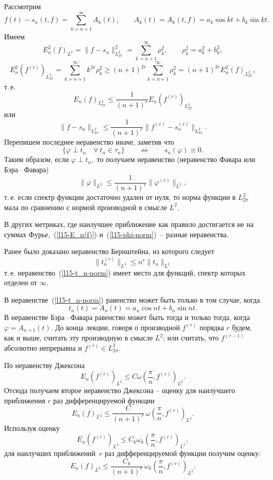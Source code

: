 Рассмотрим
 $$
 f(t)-s_n(t,f)=\sum\limits_{k=n+1}^{\infty} A_k(t),\qquad {A_k(t)=A_k(t,f)=a_k\cos kt+b_k\sin kt}.
 $$
 Имеем
$$
E_n^2(f)_{{L^2}}=\|f-s_n\|_{{L_{2\pi}^2}}^2=\sum\limits_{k=n+1}^{\infty}\rho_k^2,\qquad {\rho_k^2=a_k^2+b_k^2,}
$$
$$
E_n^2(f^{(r)})_{{L_{2\pi}^2}}=\sum\limits_{k=n+1}^{\infty} k^{2r}\rho_k^2 \ge
(n+1)^{2r} \sum\limits_{k=n+1}^{\infty} \rho_k^2=(n+1)^{2r} E_n^2(f)_{{L_{2\pi}^2}},
$$
т.\,е.
\begin{equation}\label{l15-E_n(f)}
E_n(f)_{{L_{2\pi}^2}}\le \frac{1}{(n+1)^{{r}}} E_n (f^{(r)})_{{L_{2\pi}^2}}
\end{equation}
или
$$
\|f-s_n\|_{{L_{2\pi}^2}}\le \frac{1}{(n+1)^r}\|f^{(r)}-s_n^{(r)}\|_{{L_{2\pi}^2}}.
$$
Перепишем последнее неравенство иначе, заметив что
$$
{\{\varphi \perp t_n\quad \forall\ t_n\in \tau_n\}\qquad\Longleftrightarrow\qquad s_n(\varphi)\equiv 0.}
$$
Таким образом, если $\varphi\perp t_n,$ то получаем неравенство (неравенство Фавара или Бэра\,--\,Фавара)
\begin{equation}\label{l15-phi-norm}
\|\varphi\|_{{L^2}}\le\frac{1}{(n+1)^r} \|\varphi^{(r)}\|_{{L^2}},
\end{equation}
т.\,е. если спектр функции достаточно удален от нуля, то норма функции {в $L_{2\pi}^2$} {мала по сравнению с нормой производной в смысле
$L^2$.}

\begin{Remark}
В других метриках, где наилучшее приближение {как правило} достигается {не на} суммах
Фурье,~(\ref{l15-E_n(f)}) и~(\ref{l15-phi-norm})~-- разные неравенства.
\end{Remark}

Ранее было доказано неравенство Бернштейна, из которого следует
\begin{equation}\label{l15-t_n-norm}
\|t_n^{(r)}\|_{{L^2}}\le n^r \|t_n\|_{{L^2}}
\end{equation}
т.\,е. неравенство~(\ref{l15-t_n-norm}) имеет место для функций, спектр
которых отделен от $\infty.$

В неравенстве~(\ref{l15-t_n-norm}) равенство может быть только в том
случае, когда
$$ t_n(t)=A_n(t)=a_n\cos nt+b_n\sin nt.$$
В неравенстве Бэра\,--\,Фавара равенство может быть тогда и только тогда, когда $\varphi=A_{n+1}(t).$ {До конца лекции, говоря о производной
$f^{(r)}$ порядка $r$ будем, как и выше,} {считать эту производную в смысле $L^2$; или считать, что $f^{(r-1)}$ абсолютно непрерывна} {и
$f^{(r)}\in L_{2\pi}^2$.}

По неравенству Джексона
$$E_n(f^{(r)})_{{L^2}}\le C\omega\left( \frac{\pi}{n},f^{(r)}\right)_{{L^2}}.$$
{Отсюда получаем второе неравенство Джексона --} оценку для наилучшего приближения $r$
раз дифференцируемой функции
$$
E_n(f)_{{L^2}}\le \frac{C}{(n+1)^r}\, \omega\left( \frac{\pi}{n},f^{(r)}\right)_{{L^2}}.
$$
 Используя оценку
$$
E_n(f^{(r)})_{{L^2}}\le C_k \omega_k \left(
\frac{\pi}{n},f^{(r)}\right)_{{L^2}},
$$
для наилучших приближений~$r$
раз дифференцируемой функции получим оценку:
$$
E_n(f)_{{L^2}}\le \frac{C_k}{(n+1)^r}\, \omega_k\left( \frac{\pi}{n},f^{(r)}\right)_{{L^2}}.
$$


